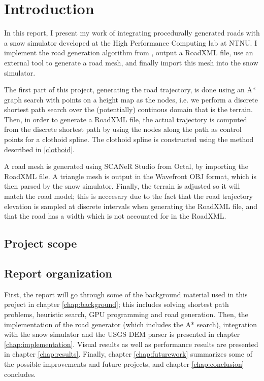 \chapter{Introduction}
\label{chap:introduction}
In this report, I present my work of integrating procedurally generated roads with a snow simulator developed at the High Performance Computing lab at NTNU. I implement the road generation algorithm from \cite{roadgen}, output a RoadXML file\cite{roadxml}, use an external tool to generate a road mesh, and finally import this mesh into the snow simulator. 

The first part of this project, generating the road trajectory, is done using an A* graph search with points on a height map as the nodes, i.e. we perform a discrete shortest path search over the (potentially) continous domain that is the terrain. Then, in order to generate a RoadXML file, the actual trajectory is computed from the discrete shortest path by using the nodes along the path as control points for a clothoid spline. The clothoid spline is constructed using the method described in \ref{clothoid}.

A road mesh is generated using SCANeR Studio from Octal, by importing the RoadXML file. A triangle mesh is output in the Wavefront OBJ format, which is then parsed by the snow simulator. Finally, the terrain is adjusted so it will match the road model; this is neccesary due to the fact that the road trajectory elevation is sampled at discrete intervals when generating the RoadXML file, and that the road has a width which is not accounted for in the RoadXML.

\section{Project scope}
\label{sec:project-scope} 


\section{Report organization}
First, the report will go through some of the background material used in this project in chapter \ref{chap:background}; this includes solving shortest path problems, heuristic search, GPU programming and road generation. Then, the implementation of the road generator (which includes the A* search), integration with the snow simulator and the USGS DEM parser is presented in chapter \ref{chap:implementation}. Visual results as well as performance results are presented in chapter \ref{chap:results}. Finally, chapter \ref{chap:futurework} summarizes some of the possible improvements and future projects, and chapter \ref{chap:conclusion} concludes.
